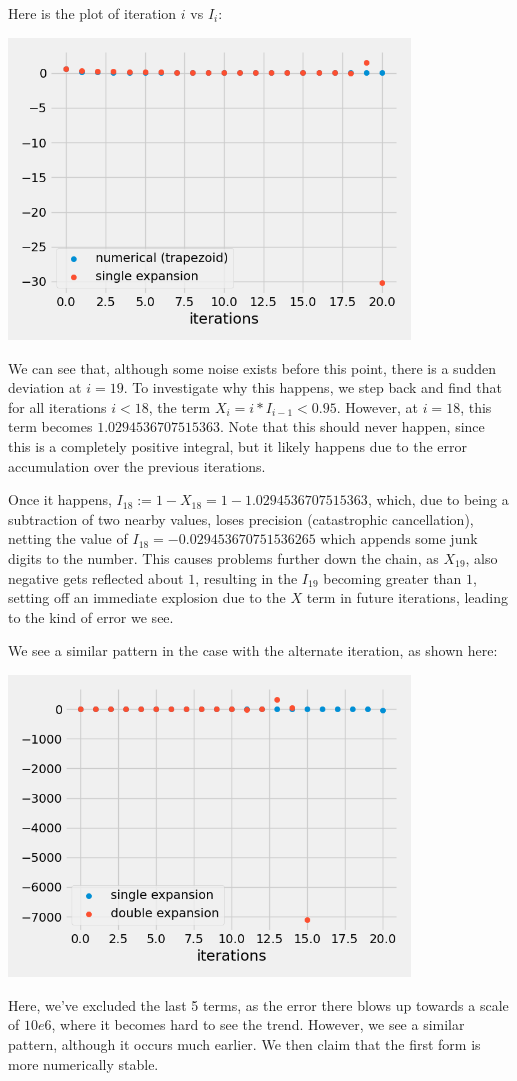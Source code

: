 Here is the plot of iteration $i$ vs $I_i$:

\begin{center}
	\includegraphics*[width=0.8\textwidth]{res/3.3-single.png}
\end{center}

We can see that, although some noise exists before this point, there is a sudden deviation at $i = 19$. To investigate why this happens, we step back and find that for all iterations $i < 18$, the term $X_i = i * I_{i - 1} < 0.95$. However, at $i = 18$, this term becomes $1.0294536707515363$. Note that this should never happen, since this is a completely positive integral, but it likely happens due to the error accumulation over the previous iterations.\bigskip

Once it happens, $I_{18} := 1 - X_{18} = 1 - 1.0294536707515363$, which, due to being a subtraction of two nearby values, loses precision (catastrophic cancellation), netting the value of $I_{18} = -0.029453670751536265$ which appends some junk digits to the number. This causes problems further down the chain, as $X_{19}$, also negative gets reflected about $1$, resulting in the $I_{19}$ becoming greater than $1$, setting off an immediate explosion due to the $X$ term in future iterations, leading to the kind of error we see.\bigskip

We see a similar pattern in the case with the alternate iteration, as shown here:

\begin{center}
	\includegraphics*[width=0.8\textwidth]{res/3.3-double.png}
\end{center}

Here, we've excluded the last 5 terms, as the error there blows up towards a scale of $10e6$, where it becomes hard to see the trend. However, we see a similar pattern, although it occurs much earlier. We then claim that the first form is more numerically stable.